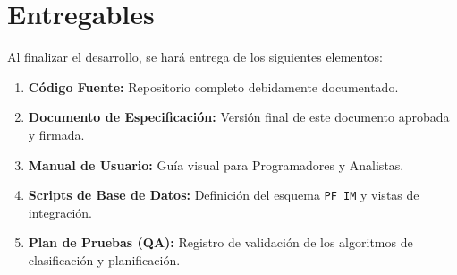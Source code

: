\documentclass[11pt, letterpaper]{article}
\begin{document}
\section{Entregables}

Al finalizar el desarrollo, se hará entrega de los siguientes elementos:

\begin{enumerate}
    \item \textbf{Código Fuente:} Repositorio completo debidamente documentado.
    \item \textbf{Documento de Especificación:} Versión final de este documento aprobada y firmada.
    \item \textbf{Manual de Usuario:} Guía visual para Programadores y Analistas.
    \item \textbf{Scripts de Base de Datos:} Definición del esquema \texttt{PF\_IM} y vistas de integración.
    \item \textbf{Plan de Pruebas (QA):} Registro de validación de los algoritmos de clasificación y planificación.
\end{enumerate}
\end{document}
